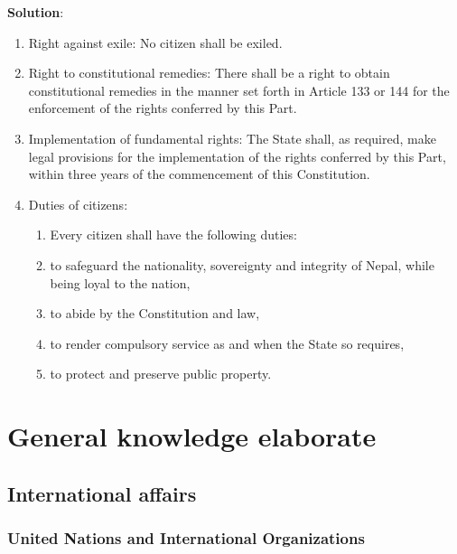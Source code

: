 \documentclass[
]{book}
\newenvironment{solution}{ {\bfseries Solution}:}{}
\begin{document}
\begin{questions}
\begin{solution}
\begin{enumerate}
\item Right against exile: No citizen shall be exiled.
\item Right to constitutional remedies: There shall be a right to obtain constitutional remedies in the manner set forth in Article 133 or 144 for the enforcement of the rights conferred by this Part.
\item Implementation of fundamental rights: The State shall, as required, make legal provisions for the implementation of the rights conferred by this Part, within three years of the commencement of this Constitution.
\item Duties of citizens:
\begin{enumerate}
\item[] Every citizen shall have the following duties:
\item to safeguard the nationality, sovereignty and integrity of Nepal, while being loyal to the nation,
\item to abide by the Constitution and law,
\item to render compulsory service as and when the State so requires,
\item to protect and preserve public property.
\end{enumerate}
\end{enumerate}
\end{solution}


\end{questions}

\hypertarget{general-knowledge-elaborate}{%
\chapter{General knowledge elaborate}\label{general-knowledge-elaborate}}

\hypertarget{international-affairs}{%
\section{International affairs}\label{international-affairs}}

\hypertarget{united-nations-and-international-organizations}{%
\subsection{United Nations and International Organizations}\label{united-nations-and-international-organizations}}
\end{document}
